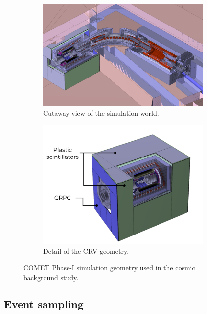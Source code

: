 \begin{figure}
    \centering
    \begin{subfigure}[b]{0.56\textwidth}
        \includegraphics[width=0.95\textwidth]{chapter5/geometry.png}
        \caption{Cutaway view of the simulation world.}
    \end{subfigure}
    \hfill
    \begin{subfigure}[b]{0.41\textwidth}
        \includegraphics[width=0.95\textwidth]{chapter5/crv_geom.pdf}
        \caption{Detail of the CRV geometry.}
    \end{subfigure}
    \caption{COMET Phase-I simulation geometry used in the cosmic background study.}
    \label{fig:bmc_geometry}
\end{figure}

\subsection{Event sampling}

